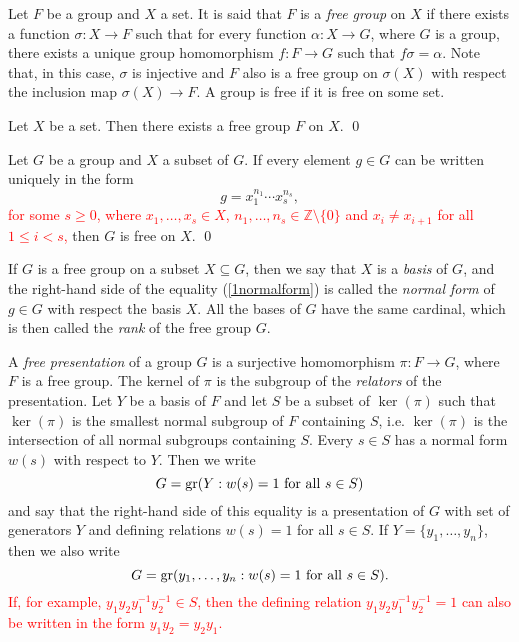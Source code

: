 Let $F$ be a group and $X$ a set. It is said that $F$ is a \emph{free group} 
on $X$ if there exists a function
$\sigma\colon X\rightarrow F$ such that for every function $\alpha\colon X\rightarrow G$, where $G$ is a group, there exists 
a unique group homomorphism $f\colon F\rightarrow G$ such that $f\sigma=\alpha$. Note that, in this case, 
$\sigma$ is injective and $F$ also is a free group on $\sigma(X)$ with respect the inclusion map $\sigma(X)\rightarrow F$.
A group is free if it is free on some set.

\begin{theorem}
    Let $X$ be a set. Then there exists a free group $F$ on $X$. \qed
\end{theorem}

\begin{proposition}
    Let $G$ be a group and $X$ a subset of $G$. If every element $g\in G$ can be written uniquely in the form
    \begin{equation}\label{1normalform}
    g=x_1^{n_1}\cdots x_s^{n_s},
    \end{equation}
    \textcolor{red}{
    for some $s\geq 0$, 
    where $x_1,\dots,x_s\in X$, $n_1,\dots,n_s\in \mathbb{Z}\setminus \{0\}$ and $x_i\neq x_{i+1}$ for all $1\leq i<s$,} 
    then $G$ is free on $X$. \qed
\end{proposition}

If $G$ is a free group on a subset $X\subseteq G$, 
then we say that $X$ is a {\em basis} of $G$, and the 
right-hand side of the equality (\ref{1normalform}) is called the {\em normal form} 
of $g\in G$ with respect the basis $X$. All the bases 
of $G$ have the same cardinal,
which is then called the {\em rank} of the free group $G$.

A {\em free presentation} of a group $G$ is a surjective homomorphism $\pi \colon F\rightarrow G$, where $F$ is a free group. The kernel of $\pi$ is the subgroup of the {\em relators} of the presentation. Let $Y$ be a basis of $F$ and let $S$ be a subset of $\ker(\pi)$ such that $\ker(\pi)$ is the smallest normal subgroup of $F$ containing $S$, i.e. $\ker(\pi)$ is the intersection of all normal subgroups containing $S$. Every $s\in S$ has a normal form $w(s)$ with respect to $Y$.
Then we write
\[
G=\operatorname{gr}(Y: w(s)=1\mbox{ for all }s\in S)
\]
and say that the right-hand side of this equality is a presentation of $G$ with set of generators $Y$ and defining relations $w(s)=1$ 
for all $s\in S$. If $Y=\{ y_1,\dots, y_n\}$, then we also write
\[
G=\operatorname{gr}(y_1,\dots, y_n: w(s)=1\mbox{ for all }s\in S).
\]
\textcolor{red}{ If, for example, $y_1y_2y_1^{-1}y_2^{-1}\in S$, then the defining relation $y_1y_2y_1^{-1}y_2^{-1}=1$ can also be written in the form $y_1y_2=y_2y_1$. }

